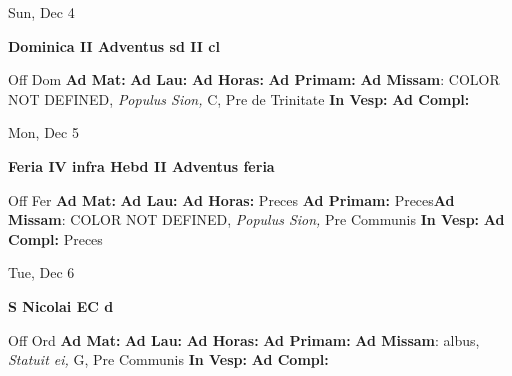 \documentclass[10pt]{memoir}
\begin{document}
\begin{center}
\begin{minipage}{3.5in}
\vspace{2em}
\begin{center}Sun, Dec 4
\end{center}
\textbf{ \large Dominica II Adventus
\textnormal{\normalsize sd II cl}}

\begin{justify}Off Dom
\textbf{Ad Mat: }
\textbf{Ad Lau: }
\textbf{Ad Horas: }
\textbf{Ad Primam: }\textbf{Ad Missam}: COLOR NOT DEFINED, \textit{Populus Sion,} C, Pre de Trinitate
\textbf{In Vesp: }
\textbf{Ad Compl: }
\end{justify}
\end{minipage}
\end{center}

\begin{center}
\begin{minipage}{3.5in}
\vspace{2em}
\begin{center}Mon, Dec 5
\end{center}
\textbf{ \large Feria IV infra Hebd II Adventus
\textnormal{\normalsize feria}}

\begin{justify}Off Fer
\textbf{Ad Mat: }
\textbf{Ad Lau: }
\textbf{Ad Horas: }Preces
\textbf{Ad Primam: }Preces\textbf{Ad Missam}: COLOR NOT DEFINED, \textit{Populus Sion,} Pre Communis
\textbf{In Vesp: }
\textbf{Ad Compl: }Preces
\end{justify}
\end{minipage}
\end{center}

\begin{center}
\begin{minipage}{3.5in}
\vspace{2em}
\begin{center}Tue, Dec 6
\end{center}
\textbf{ \large S Nicolai EC
\textnormal{\normalsize d}}

\begin{justify}Off Ord
\textbf{Ad Mat: }
\textbf{Ad Lau: }
\textbf{Ad Horas: }
\textbf{Ad Primam: }\textbf{Ad Missam}: albus, \textit{Statuit ei,} G, Pre Communis
\textbf{In Vesp: }
\textbf{Ad Compl: }
\end{justify}
\end{minipage}
\end{center}
\end{document}
